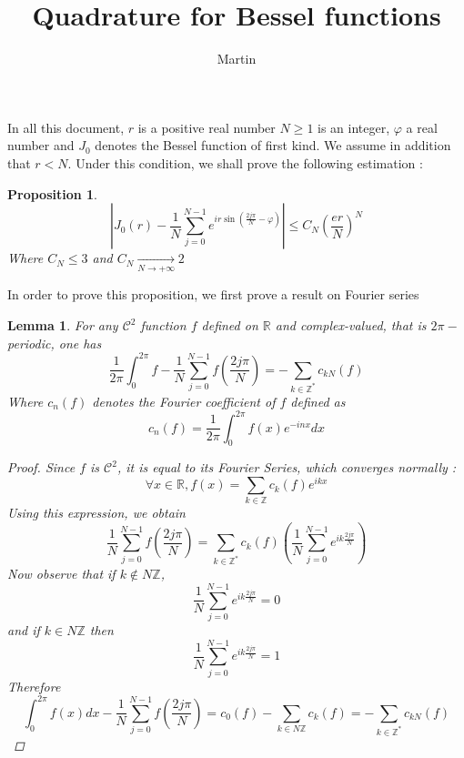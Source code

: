 \documentclass[11pt,a4paper]{article}
\author{Martin}
\title{Quadrature for Bessel functions}
\begin{document}
\maketitle
\theoremstyle{plain}
\newtheorem{The}{Theorem}[section]
\newtheorem{Prop}{Proposition}[section]
\newtheorem{Lem}{Lemma}[section]
\theoremstyle{definition}
\newtheorem{Def}{Definition}[section]
\newcommand{\enstq}[2]{\left\{#1\mathrel{}\middle|\mathrel{}#2\right\}}
\newcommand{\Lp}[2]{L^#1(#2)}
\newcommand{\Sob}[3]{W^{#1,#2}(#3)}
\newcommand{\RN}[0]{\mathbb{R}^N}
\newcommand{\norm}[1]{\left\|#1\right\|}
\newcommand{\sinc}[0]{\textup{sinc}}
\newcommand{\N}[0]{\mathbb{N}}
\newcommand{\R}[0]{\mathbb{R}}
\newcommand{\Z}[0]{\mathbb{Z}}

In all this document, $r$ is a positive real number $N \geq 1$ is an integer, $\varphi$ a real number and $J_0$ denotes the Bessel function of first kind. We assume in addition that $r < N$. Under this condition, we shall prove the following estimation :
\begin{Prop}
\[\left|J_0(r) -  \dfrac{1}{N}\sum_{j=0}^{N-1}e^{ir\sin\left(\frac{2j\pi}{N}-\varphi\right)} \right| \leq C_N \left(\dfrac{er}{N}\right)^N\]
Where $C_N \leq 3$ and $C_N \underset{N\to+\infty}{\longrightarrow} 2$
\end{Prop}

In order to prove this proposition, we first prove a result on Fourier series
\begin{Lem} For any $\mathcal{C}^2$ function $f$ defined on $\mathbb{R}$ and complex-valued, that is $2\pi-$periodic, one has \[\dfrac{1}{2\pi}\int_{0}^{2\pi}f - \dfrac{1}{N}\sum_{j=0}^{N-1}f\left(\frac{2j\pi}{N} \right) = - \sum\limits_{k \in \Z^*}c_{kN}(f)\]
Where $c_n(f)$ denotes the Fourier coefficient of $f$ defined as \[c_n(f) = \dfrac{1}{2\pi}\int_{0}^{2\pi}f(x)e^{-inx}dx\]
\begin{proof}
Since $f$ is $\mathcal{C}^2$, it is equal to its Fourier Series, which converges normally : \[\forall x \in \mathbb{R}, f(x) = \sum_{k\in\Z} c_k(f)e^{ikx}\] Using this expression, we obtain \[\dfrac{1}{N}\sum_{j=0}^{N-1}f\left(\frac{2j\pi}{N}\right) = \sum\limits_{k\in \Z^*}c_k(f)\left(\frac{1}{N}\sum_{j=0}^{N-1}e^{ik\frac{2j\pi}{N}}\right)\] Now observe that if $k\notin N\Z$, \[\dfrac{1}{N}\sum_{j=0}^{N-1}e^{ik\frac{2j\pi}{N}} = 0\] and if $k\in N\Z$ then \[\dfrac{1}{N}\sum_{j=0}^{N-1}e^{ik\frac{2j\pi}{N}} = 1\] Therefore \[\int_{0}^{2\pi}f(x)dx - \dfrac{1}{N}\sum_{j=0}^{N-1}f\left(\frac{2j\pi}{N} \right) = c_0(f) - \sum\limits_{k \in N\Z}c_{k}(f) = - \sum\limits_{k \in \Z^*}c_{kN}(f)\]
\end{proof}
\end{Lem}
\end{document}
